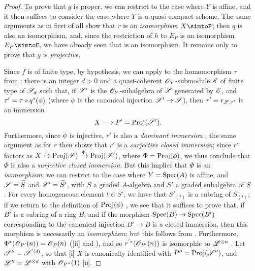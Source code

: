 \begin{proof}
To prove that $g$ is proper, we can restrict to the case where $Y$ is affine, and it then suffices to consider the case where $Y$ is a quasi-compact scheme.
The same arguments as in  first of all show that $r$ is an \emph{isomorphism} $X\simtoP$;
then $q$ is also an isomorphism, and, since the restriction of $h$ to $E_P$ is an isomorphism $E_P\simtoE$, we have already seen that  is an isomorphism.
It remains only to prove that $g$ is \emph{projective}.

Since $f$ is of finite type, by hypothesis, we can apply  to the homomorphism
$\tau$ from :
there is an integer $d>0$ and a quasi-coherent $\mathscr{O}_Y$-submodule $\mathscr{E}$ of finite type of $\mathscr{S}_d$ such that, if $\mathscr{S}'$ is the $\mathscr{O}_Y$-subalgebra of $\mathscr{S}$ generated by $\mathscr{E}$, and $\tau'=\tau\circ q^*(\phi)$ (where $\phi$ is the canonical injection $\sh{S}'\to\sh{S}$), then $r'=r_{\mathscr{L},\tau'}$ is an immersion
\[
  X\to P'=\Proj(\sh{S}').
\]
Furthermore, since $\phi$ is injective, $r'$ is also a \emph{dominant immersion} ;
the same argument as for $r$ then shows that $r'$ is a \emph{surjective closed immersion};
since $r'$ factors as $X\xrightarrow{r}\operatorname{Proj}(\mathscr{S})\xrightarrow{\Phi}\operatorname{Proj}(\mathscr{S}')$, where $\Phi=\operatorname{Proj}(\phi)$, we thus conclude that $\Phi$ is also a \emph{surjective closed immersion}.
But this implies that $\Phi$ is an \emph{isomorphism};
we can restrict to the case where $Y=\operatorname{Spec}(A)$ is affine, and $\mathscr{S}=\widetilde{S}$ and $\mathscr{S}'=\widetilde{S'}$, with $S$ a graded $A$-algebra and $S'$ a graded subalgebra of $S$.
For every homogeneous element $t\in S'$, we have that $S'_{(t)}$ is a subring of $S_{(t)}$;
if we return to the definition of $\operatorname{Proj}(\phi)$ , we see that it suffices to prove that, if $B'$ is a subring of a ring $B$, and if the morphism $\Spec(B)\to\Spec(B')$ corresponding to the canonical injection $B'\to B$ is a closed immersion, then this morphism is necessarily an \emph{isomorphism};
but this follows from .
Furthermore, $\Phi^*(\mathscr{O}_{P'}(n))=\mathscr{O}_P(n)$ ([ii] and ), and so $r^{'*}(\mathscr{O}_{P'}(n))$ is isomorphic to $\mathscr{L}^{\otimes n}$ .
Let $\mathscr{S}''=\mathscr{S}^{'(d)}$, so that [i] $X$ is canonically identified with $P''=\operatorname{Proj}(\mathscr{S}'')$, and $\mathscr{L}''=\mathscr{L}^{\otimes d}$ with $\mathscr{O}_{P''}(1)$ [ii].


\end{proof}
